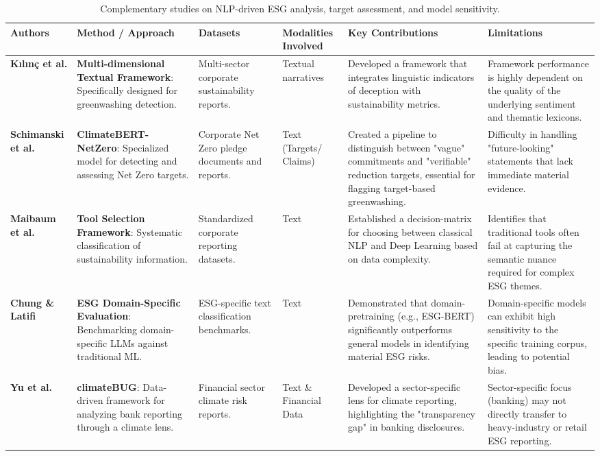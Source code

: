 \begin{landscape}
\begin{table}[p]
\centering
\caption{Complementary studies on NLP-driven ESG analysis, target assessment, and model sensitivity.}
\label{tab:relatedwork-esg-greenwashing-overview-b}
\small
\renewcommand{\arraystretch}{1.2}
\begin{tabularx}{\linewidth}{|p{1.8cm}|X|X|p{1.8cm}|X|X|}
\hline
Authors & Method / Approach & Datasets & Modalities Involved & Key Contributions & Limitations \\ \hline
\textbf{Kılınç et al.}  \parencite{yavuz_k_l_n__64e32f80} & \textbf{Multi-dimensional Textual Framework}: Specifically designed for greenwashing detection. & Multi-sector corporate sustainability reports. & Textual narratives & Developed a framework that integrates linguistic indicators of deception with sustainability metrics. & Framework performance is highly dependent on the quality of the underlying sentiment and thematic lexicons. \\ \hline
\textbf{Schimanski et al.}  \parencite{tobias_schimanski_241ada20} & \textbf{ClimateBERT-NetZero}: Specialized model for detecting and assessing Net Zero targets. & Corporate Net Zero pledge documents and reports. & Text (Targets/ Claims) & Created a pipeline to distinguish between "vague" commitments and "verifiable" reduction targets, essential for flagging target-based greenwashing. & Difficulty in handling "future-looking" statements that lack immediate material evidence. \\ \hline
\textbf{Maibaum et al.}  \parencite{frederik_maibaum_b8629037} & \textbf{Tool Selection Framework}: Systematic classification of sustainability information. & Standardized corporate reporting datasets. & Text & Established a decision-matrix for choosing between classical NLP and Deep Learning based on data complexity. & Identifies that traditional tools often fail at capturing the semantic nuance required for complex ESG themes. \\ \hline
\textbf{Chung \& Latifi}  \parencite{tae_sun_chung_e16a4c18} & \textbf{ESG Domain-Specific Evaluation}: Benchmarking domain-specific LLMs against traditional ML. & ESG-specific text classification benchmarks. & Text & Demonstrated that domain-pretraining (e.g., ESG-BERT) significantly outperforms general models in identifying material ESG risks. & Domain-specific models can exhibit high sensitivity to the specific training corpus, leading to potential bias. \\ \hline
\textbf{Yu et al.}  \parencite{yinan_yu_e282fd98} & \textbf{climateBUG}: Data-driven framework for analyzing bank reporting through a climate lens. & Financial sector climate risk reports. & Text \& Financial Data & Developed a sector-specific lens for climate reporting, highlighting the "transparency gap" in banking disclosures. & Sector-specific focus (banking) may not directly transfer to heavy-industry or retail ESG reporting. \\ \hline

\end{tabularx}
\end{table}
\end{landscape}
